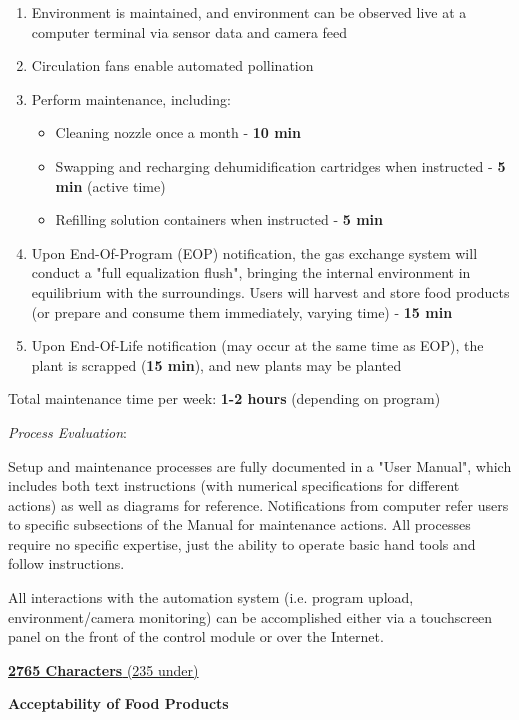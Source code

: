 \documentclass{../tex/report}
\begin{document}
\begin{enumerate}
    \item Environment is maintained, and environment can be observed live at a computer terminal via sensor data and camera feed
    \item Circulation fans enable automated pollination
    \item Perform maintenance, including:
    \begin{itemize}
        \item Cleaning nozzle once a month - \textbf{10 min}
        \item Swapping and recharging dehumidification cartridges when instructed - \textbf{5 min} (active time)
        \item Refilling solution containers when instructed - \textbf{5 min}
    \end{itemize}
    \item Upon End-Of-Program (EOP) notification, the gas exchange system will conduct a "full equalization flush", bringing the internal environment in equilibrium with the surroundings. Users will harvest and store food products (or prepare and consume them immediately, varying time) - \textbf{15 min}
    \item Upon End-Of-Life notification (may occur at the same time as EOP), the plant is scrapped (\textbf{15 min}), and new plants may be planted
\end{enumerate}

Total maintenance time per week: \textbf{1-2 hours} (depending on program)

\textit{Process Evaluation}:

Setup and maintenance processes are fully documented in a "User Manual", which includes both text instructions (with numerical specifications for different actions) as well as diagrams for reference. Notifications from computer refer users to specific subsections of the Manual for maintenance actions. All processes require no specific expertise, just the ability to operate basic hand tools and follow instructions.

All interactions with the automation system (i.e. program upload, environment/camera monitoring) can be accomplished either via a touchscreen panel on the front of the control module or over the Internet.

\uline{\textbf{2765 Characters} (235 under)}

\newpage

\textbf{Acceptability of Food Products}
\label{sec:acceptability-products}
\end{document}
